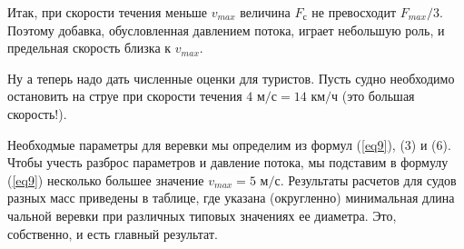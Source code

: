 \documentclass[12pt,a4paper]{article}
\begin{document}
\begin{multicols}{2}
Итак, при скорости течения меньше $v_{max}$ величина $F_{\text{с}}$ не превосходит $F_{max}/3$. Поэтому добавка, обусловленная давлением потока, играет небольшую роль, и предельная скорость близка к $v_{max}$.

Ну а теперь надо дать численные оценки для туристов. Пусть судно необходимо остановить на струе при скорости течения ${4 \text{ м/с} = 14 \text{ км/ч}}$ (это большая скорость!).

Необходмые параметры для веревки мы определим из формул (\ref{eq9}), (3) и (6). Чтобы учесть разброс параметров и давление потока, мы подставим в формулу (\ref{eq9}) несколько большее значение $v_{max} = 5\text{ м/с}$. Результаты расчетов для судов разных масс приведены в таблице, где указана (округленно) минимальная длина чальной веревки при различных типовых значениях ее диаметра. Это, собственно, и есть главный результат.



\end{multicols}
\end{document}
